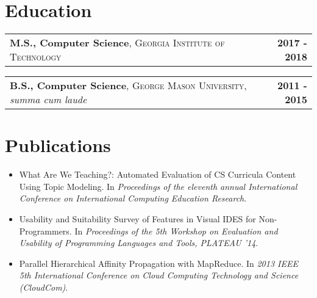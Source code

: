 \documentclass[10pt,letterpaper]{article}
\newenvironment{details}
{\begin{itemize}}
{\end{itemize}}
\begin{document}
  \section{Education}

  \noindent
  \begin{tabularx}{\textwidth}{@{}X r@{}}
    \textbf{M.S., Computer Science}, \textsc{Georgia Institute of Technology} & \textbf{2017 - 2018}
  \end{tabularx}

  \noindent
  \begin{tabularx}{\textwidth}{@{}X r@{}}
    \textbf{B.S., Computer Science}, \textsc{George Mason University}, \emph{summa cum laude} & \textbf{2011 - 2015}
  \end{tabularx}


  \section{Publications}
  \noindent
  \begin{details}
  \item What Are We Teaching?: Automated Evaluation of CS Curricula Content
  Using Topic Modeling. In \emph{Proceedings of the eleventh annual
  International Conference on International Computing Education Research}.

  \item Usability and Suitability Survey of Features in Visual IDES for
  Non-Programmers. In \emph{Proceedings of the 5th Workshop on Evaluation
  and Usability of Programming Languages and Tools, PLATEAU '14}.

  \item Parallel Hierarchical Affinity Propagation with MapReduce. In
  \emph{2013 IEEE 5th International Conference on Cloud Computing Technology
  and Science (CloudCom)}.
  \end{details}
\end{document}
